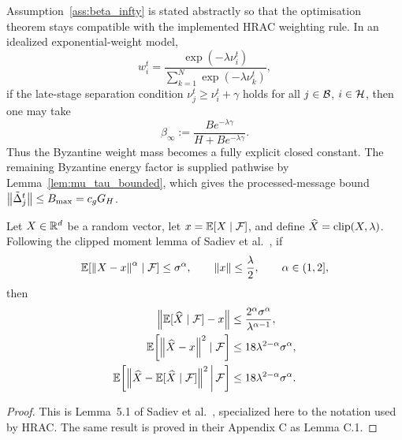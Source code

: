 \begin{remark}
\label{rem:beta_infty_instantiation}
Assumption~\ref{ass:beta_infty} is stated abstractly so that the optimisation
theorem stays compatible with the implemented HRAC weighting rule. In an
idealized exponential-weight model,
\[
    w_i^t
    =
    \frac{\exp(-\lambda \nu_i^t)}
         {\sum_{k=1}^N \exp(-\lambda \nu_k^t)},
\]
if the late-stage separation condition
\(
\nu_j^t \ge \nu_i^t+\gamma
\)
holds for all \(j\in\mathcal{B}\), \(i\in\mathcal{H}\), then one may take
\begin{equation}
    \beta_\infty
    :=
    \frac{B e^{-\lambda\gamma}}
         {H+B e^{-\lambda\gamma}}.
    \label{eq:beta_infty_explicit}
\end{equation}
Thus the Byzantine weight mass becomes a fully explicit closed constant. The
remaining Byzantine energy factor is supplied pathwise by
Lemma~\ref{lem:mu_tau_bounded}, which gives the processed-message bound
\(\left\lVert \tilde\Delta_j^t \right\rVert\le B_{\max}=c_gG_H\).
\end{remark}

\begin{lemma}
\label{lem:clip_sgd_moment}
Let \(X\in\mathbb{R}^d\) be a random vector, let \(x=\mathbb{E}[X\mid\mathcal{F}]\), and define
\(\widehat X=\operatorname{clip}(X,\lambda)\). Following the clipped moment lemma of
Sadiev et al.~\cite[Lemma~5.1]{sadiev2023highprob}, if
\[
    \mathbb{E}\!\left[\left\lVert X-x \right\rVert^{\alpha}\mid\mathcal{F}\right]\le \sigma^\alpha,
    \qquad
    \left\lVert x \right\rVert\le \frac{\lambda}{2},
    \qquad
    \alpha\in(1,2],
\]
then
\begin{align}
    \left\lVert \mathbb{E}[\widehat X\mid\mathcal{F}]-x \right\rVert
    &\le
    \frac{2^\alpha\sigma^\alpha}{\lambda^{\alpha-1}},
    \label{eq:clip_sgd_bias}\\
    \mathbb{E}\!\left[\left\lVert \widehat X-x \right\rVert^2\mid\mathcal{F}\right]
    &\le
    18\lambda^{2-\alpha}\sigma^\alpha,
    \label{eq:clip_sgd_second}\\
    \mathbb{E}\!\left[
        \left\lVert \widehat X-\mathbb{E}[\widehat X\mid\mathcal{F}] \right\rVert^2
        \,\middle|\,\mathcal{F}
    \right]
    &\le
    18\lambda^{2-\alpha}\sigma^\alpha.
    \label{eq:clip_sgd_variance}
\end{align}
\end{lemma}

\begin{proof}
This is Lemma~5.1 of Sadiev et al.~\cite{sadiev2023highprob}, specialized here
to the notation used by HRAC. The same result is proved in their Appendix C as
Lemma C.1.
\end{proof}

